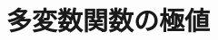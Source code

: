 \documentclass[../../topic_calculus]{subfiles}
\begin{document}
\chapter{多変数関数の極値}




\end{document}
